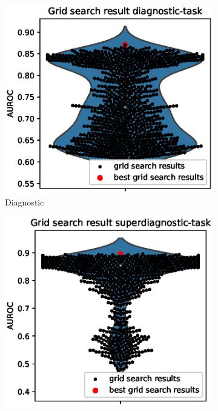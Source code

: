 \begin{figure}[hp]
     \centering
     \begin{subfigure}[b]{0.45\textwidth}
        \includegraphics[width=1.0\textwidth]{images/violindiagnostic.eps}
        \caption{Diagnostic}
        \label{fig:gridsearch_diag}
     \end{subfigure}
     \hfill
     \begin{subfigure}[b]{0.45\textwidth}
        \includegraphics[width=1.0\textwidth]{images/violinsuperdiagnostic.eps}

\end{subfigure}
\end{figure}

